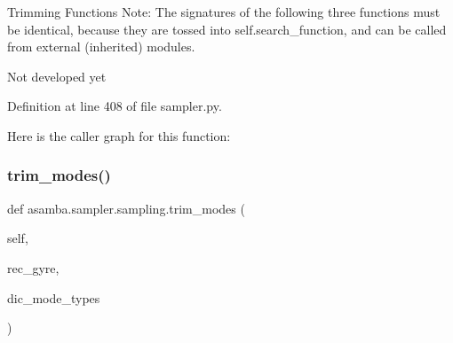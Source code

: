 Trimming Functions Note\+: The signatures of the following three functions must be identical, because they are tossed into self.\+search\+\_\+function, and can be called from external (inherited) modules. 

\begin{DoxyVerb}Not developed yet \end{DoxyVerb}
 

Definition at line 408 of file sampler.\+py.

Here is the caller graph for this function\+:
\mbox{\label{classasamba_1_1sampler_1_1sampling_ad67c8918488194428f7733918a55a4a0}} 
\subsubsection{\texorpdfstring{trim\+\_\+modes()}{trim\_modes()}}
{\footnotesize\ttfamily def asamba.\+sampler.\+sampling.\+trim\+\_\+modes (\begin{DoxyParamCaption}\item[{}]{self,  }\item[{}]{rec\+\_\+gyre,  }\item[{}]{dic\+\_\+mode\+\_\+types }\end{DoxyParamCaption})}

